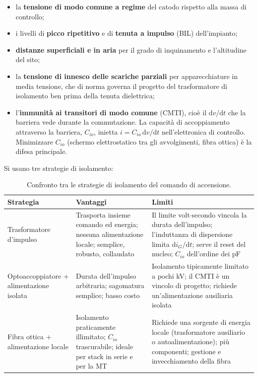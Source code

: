 \documentclass[11pt,a4paper]{article}
\begin{document}
\begin{itemize}
  \item la \textbf{tensione di modo comune a regime} del catodo rispetto alla massa
        di controllo;
  \item i livelli di \textbf{picco ripetitivo} e di \textbf{tenuta a impulso} (BIL)
        dell'impianto;
  \item \textbf{distanze superficiali e in aria} per il grado di inquinamento e
        l'altitudine del sito;
  \item la \textbf{tensione di innesco delle scariche parziali} per apparecchiature
        in media tensione, che di norma governa il progetto del trasformatore di
        isolamento ben prima della tenuta dielettrica;
  \item l'\textbf{immunità ai transitori di modo comune} (CMTI), cioè il
        $\mathrm{d}v/\mathrm{d}t$ che la barriera vede durante la commutazione. La
        capacità di accoppiamento attraverso la barriera, $C_{io}$, inietta
        $i = C_{io}\,\mathrm{d}v/\mathrm{d}t$ nell'elettronica di controllo.
        Minimizzare $C_{io}$ (schermo elettrostatico tra gli avvolgimenti, fibra
        ottica) è la difesa principale.
\end{itemize}

Si usano tre strategie di isolamento:

\begin{table}[htbp]
\centering
\caption{Confronto tra le strategie di isolamento del comando di accensione.}
\label{tab:iso}
\begin{tabular}{@{}p{3.1cm}p{4.6cm}p{4.6cm}@{}}
\toprule
\textbf{Strategia} & \textbf{Vantaggi} & \textbf{Limiti} \\
\midrule
Trasformatore d'impulso &
  Trasporta insieme comando ed energia; nessuna alimentazione locale; semplice,
  robusto, collaudato &
  Il limite volt$\cdot$secondo vincola la durata dell'impulso; l'induttanza di
  dispersione limita $\mathrm{d}i_G/\mathrm{d}t$; serve il reset del nucleo;
  $C_{io}$ dell'ordine dei \si{\pico\farad} \\
\addlinespace
Optoaccoppiatore + alimentazione isolata &
  Durata dell'impulso arbitraria; sagomatura semplice; basso costo &
  Isolamento tipicamente limitato a pochi \si{\kilo\volt}; il CMTI è un vincolo di
  progetto; richiede un'alimentazione ausiliaria isolata \\
\addlinespace
Fibra ottica + alimentazione locale &
  Isolamento praticamente illimitato; $C_{io}$ trascurabile; ideale per stack in
  serie e per la MT &
  Richiede una sorgente di energia locale (trasformatore ausiliario o
  autoalimentazione); più componenti; gestione e invecchiamento della fibra \\
\bottomrule
\end{tabular}
\end{table}
\end{document}
